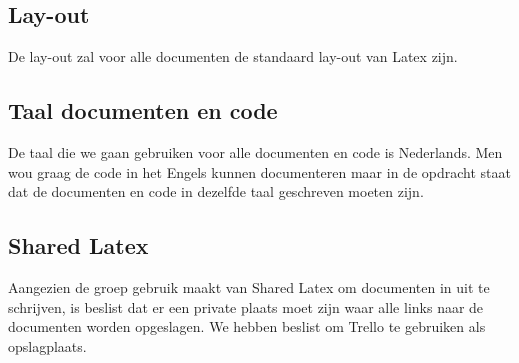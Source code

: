 \subsection{Lay-out}
De lay-out zal voor alle documenten de standaard lay-out van Latex zijn. 

\subsection{Taal documenten en code}
De taal die we gaan gebruiken voor alle documenten en code is Nederlands. Men wou graag de code in het Engels kunnen documenteren maar in de opdracht staat dat de documenten en code in dezelfde taal geschreven moeten zijn.

\subsection{Shared Latex}
Aangezien de groep gebruik maakt van Shared Latex om documenten in uit te schrijven, is beslist dat er een private plaats moet zijn waar alle links naar de documenten worden opgeslagen. We hebben beslist om Trello te gebruiken als opslagplaats.

